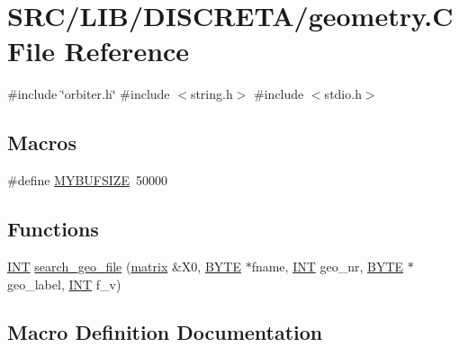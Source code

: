 \hypertarget{geometry_8_c}{}\section{S\+R\+C/\+L\+I\+B/\+D\+I\+S\+C\+R\+E\+T\+A/geometry.C File Reference}
\label{geometry_8_c}
{\ttfamily \#include \char`\"{}orbiter.\+h\char`\"{}}\newline
{\ttfamily \#include $<$string.\+h$>$}\newline
{\ttfamily \#include $<$stdio.\+h$>$}\newline
\subsection*{Macros}
\begin{DoxyCompactItemize}
\item 
\#define \mbox{\hyperlink{geometry_8_c_a7a9d33b0a40f837721cf77030e2e121d}{M\+Y\+B\+U\+F\+S\+I\+ZE}}~50000
\end{DoxyCompactItemize}
\subsection*{Functions}
\begin{DoxyCompactItemize}
\item 
\mbox{\hyperlink{galois_8h_a09fddde158a3a20bd2dcadb609de11dc}{I\+NT}} \mbox{\hyperlink{geometry_8_c_a11af609febe3a9db20d8236af36928c5}{search\+\_\+geo\+\_\+file}} (\mbox{\hyperlink{classmatrix}{matrix}} \&X0, \mbox{\hyperlink{galois_8h_ab6cc7b4aeb6ea31aba2b3fbfc83ff5e6}{B\+Y\+TE}} $\ast$fname, \mbox{\hyperlink{galois_8h_a09fddde158a3a20bd2dcadb609de11dc}{I\+NT}} geo\+\_\+nr, \mbox{\hyperlink{galois_8h_ab6cc7b4aeb6ea31aba2b3fbfc83ff5e6}{B\+Y\+TE}} $\ast$geo\+\_\+label, \mbox{\hyperlink{galois_8h_a09fddde158a3a20bd2dcadb609de11dc}{I\+NT}} f\+\_\+v)
\end{DoxyCompactItemize}


\subsection{Macro Definition Documentation}
\mbox{\label{geometry_8_c_a7a9d33b0a40f837721cf77030e2e121d}} 

